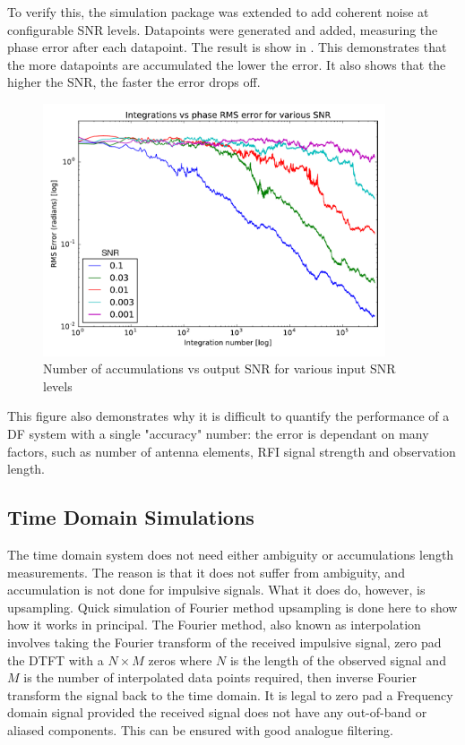 To verify this, the simulation package was extended to add coherent noise at configurable SNR levels. Datapoints were generated and added, measuring the phase error after each datapoint. The result is show in . This demonstrates that the more datapoints are accumulated the lower the error. It also shows that the higher the SNR, the faster the error drops off.

\begin{figure}
  \centering
  \includegraphics[width=0.9\textwidth]{integration-vs-error-combined-5}
  \caption{Number of accumulations vs output SNR for various input SNR levels}
  \label{fig:system-design-integration-vs-error}
\end{figure}

This figure also demonstrates why it is difficult to quantify the performance of a DF system with a single "accuracy" number: the error is dependant on many factors, such as number of antenna elements, RFI signal strength and observation length.

\subsection{Time Domain Simulations}
The time domain system does not need either ambiguity or accumulations length measurements. The reason is that it does not suffer from ambiguity, and accumulation is not done for impulsive signals. What it does do, however, is upsampling. Quick simulation of Fourier method upsampling is done here to show how it works in principal. The Fourier method, also known as interpolation involves taking the Fourier transform of the received impulsive signal, zero pad the DTFT with a \(N \times M\) zeros where \(N\) is the length of the observed signal and \(M\) is the number of interpolated data points required, then inverse Fourier transform the signal back to the time domain. It is legal to zero pad a Frequency domain signal provided the received signal does not have any out-of-band or aliased components. This can be ensured with good analogue filtering.

